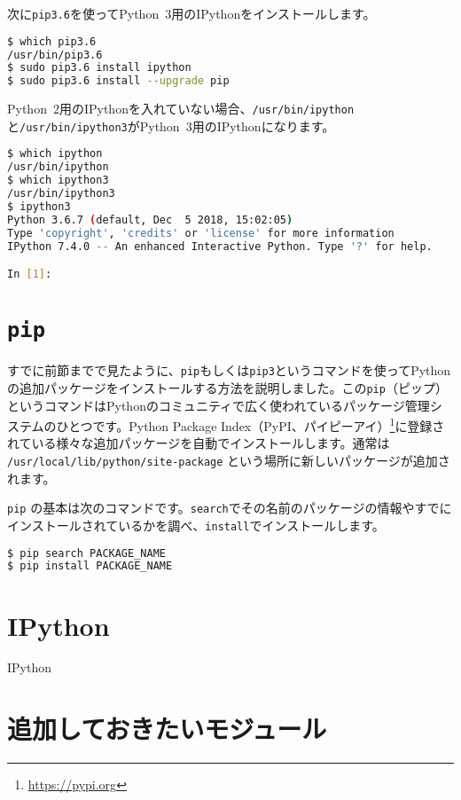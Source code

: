 次に\texttt{pip3.6}を使ってPython~3用のIPythonをインストールします。

\begin{lstlisting}[language=bash]
$ which pip3.6 
/usr/bin/pip3.6
$ sudo pip3.6 install ipython
$ sudo pip3.6 install --upgrade pip
\end{lstlisting}

Python~2用のIPythonを入れていない場合、\texttt{/usr/bin/ipython}と\texttt{/usr/bin/ipython3}がPython~3用のIPythonになります。

\begin{lstlisting}[language=bash]
$ which ipython
/usr/bin/ipython
$ which ipython3
/usr/bin/ipython3
$ ipython3 
Python 3.6.7 (default, Dec  5 2018, 15:02:05) 
Type 'copyright', 'credits' or 'license' for more information
IPython 7.4.0 -- An enhanced Interactive Python. Type '?' for help.

In [1]:
\end{lstlisting}

\section{\texttt{pip}}

すでに前節までで見たように、\texttt{pip}もしくは\texttt{pip3}というコマンドを使ってPythonの追加パッケージをインストールする方法を説明しました。この\texttt{pip}（ピップ）というコマンドはPythonのコミュニティで広く使われているパッケージ管理システムのひとつです。Python Package Index（PyPI、パイピーアイ）\footnote{\url{https://pypi.org}}に登録されている様々な追加パッケージを自動でインストールします。通常は \texttt{/usr/local/lib/python/site-package} という場所に新しいパッケージが追加されます。

\texttt{pip} の基本は次のコマンドです。\texttt{search}でその名前のパッケージの情報やすでにインストールされているかを調べ、\texttt{install}でインストールします。
\begin{lstlisting}[language=bash]
$ pip search PACKAGE_NAME
$ pip install PACKAGE_NAME
\end{lstlisting}  

\section{IPython}
IPython

\section{追加しておきたいモジュール}

